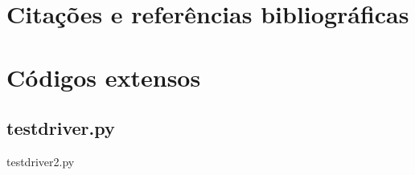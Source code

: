 \documentclass[12pt,a4paper,twoside]{report}
\begin{document}
\chapter{Citações e referências bibliográficas}








\clearpage
{}
\appendix

\chapter{Códigos extensos \label{ap:testdriver}}
\section{testdriver.py}
 {testdriver2.py}
\end{document}
